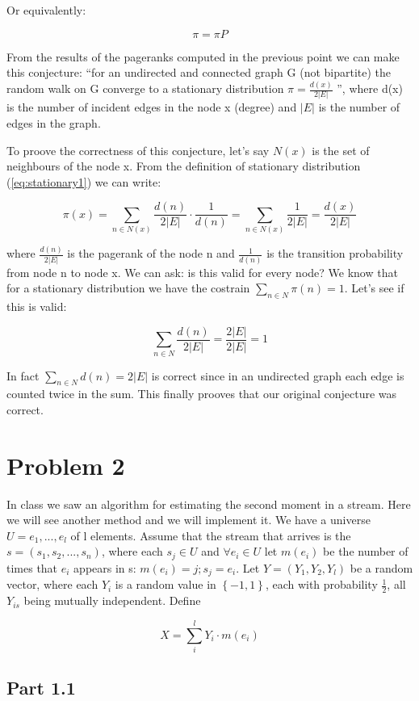 \documentclass{article}
\begin{document}
Or equivalently:

$$
\pi = \pi P
$$

From the results of the pageranks computed in the previous point we can make this conjecture: ``for an undirected and connected graph G (not bipartite) the random walk on G converge to a stationary distribution $\pi=\frac{d(x)}{2|E|}$ '', where d(x) is the number of incident edges in the node x (degree) and $|E|$ is the number of edges in the graph.

To proove the correctness of this conjecture, let's say $N(x)$ is the set of neighbours of the node x. From the definition of stationary distribution (\ref{eq:stationary1}) we can write:

$$
\pi(x) = \sum_{n \in N(x)} \frac{d(n)}{2|E|} \cdot \frac{1}{d(n)} = \sum_{n \in N(x)} \frac{1}{2|E|} = \frac{d(x)}{2|E|}
$$

where $\frac{d(n)}{2|E|}$ is the pagerank of the node n and $\frac{1}{d(n)}$ is the transition probability from node n to node x. We can ask: is this valid for every node? We know that for a stationary distribution we have the costrain $\sum_{n \in N} \pi(n) = 1$. Let's see if this is valid:

$$
\sum_{n \in N} \frac{d(n)}{2|E|} = \frac{2|E|}{2|E|} = 1
$$

In fact $\sum_{n \in N} d(n) = 2|E|$ is correct since in an undirected graph each edge is counted twice in the sum. This finally prooves that our original conjecture was correct.








\section{Problem 2}
In class we saw an algorithm for estimating the second moment in a stream. Here we will see another method and we will implement it.
We have a universe $U = {e_1, . . . , e_l}$ of l elements. Assume that the stream that arrives is the $s = (s_1,s_2,...,s_n)$,
where each $s_j \in U$ and $\forall e_i \in U$ let $m(e_i)$ be the number of times that $e_i$ appears in s: $m(e_i) =  { j ; s_j = e_i } $.
Let $Y = (Y_1, Y_2, Y_l)$ be a random vector, where each $Y_i$ is a random value in $\left\{ -1, 1 \right\}$, each with probability $\frac{1}{2}$, all $Y_{is}$ being mutually independent.
Define

$$ X = \sum_{i}^{l} Y_{i} \cdot m(e_i) $$


\subsection{Part 1.1}
\end{document}
